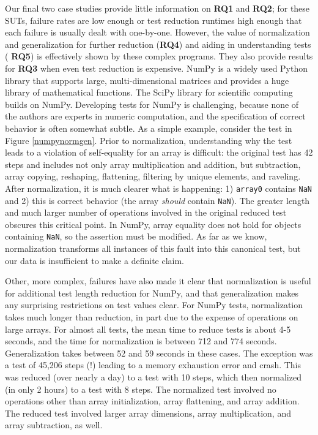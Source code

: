 Our final two case studies provide little information on {\bf RQ1} and
{\bf RQ2}; for these SUTs, failure rates are low enough or test
reduction runtimes high enough that each failure is usually dealt with
one-by-one.  However, the value of normalization and generalization
for further reduction ({\bf RQ4}) and aiding in understanding tests ({\bf
  RQ5}) is effectively shown by these complex programs.  They also provide
results for {\bf RQ3} when even test reduction is expensive.
NumPy \cite{NumPy} is a widely used Python library that
supports large, multi-dimensional matrices and provides a huge library
of mathematical functions.  The SciPy library for scientific
computing builds on NumPy.  Developing tests for NumPy is challenging,
because none of the authors are experts in numeric computation, and
the specification of correct behavior is often somewhat subtle.  As a
simple example, consider the test in Figure \ref{numpynormgen}.  Prior to
normalization, understanding why the test leads to a violation of
self-equality for an array is difficult: the original test has 42
steps and includes not only array multiplication and addition, but
subtraction, array copying, reshaping, flattening,  filtering by
unique elements, and raveling.  After
normalization, it is much clearer what is happening: 1) {\tt array0}
contains {\tt NaN} and 2) this is correct behavior (the array
\emph{should} contain {\tt NaN}).  The greater length and much larger
number of operations involved in the original reduced test
obscures this critical point.  In NumPy, array equality does not hold
for objects containing {\tt NaN}, so the assertion must be modified.
As far as we know, normalization transforms all instances of this
fault into this canonical test, but our data is insufficient to make a definite claim.

Other, more complex, failures have also made it clear that
normalization is useful for additional test length reduction for
NumPy, and that generalization makes any surprising restrictions on
test values clear.  For NumPy tests, normalization takes much longer
than reduction, in part due to the expense of operations on large
arrays.  For almost all tests, the mean time to reduce tests
is about 4-5 seconds, and the time for normalization is between 712
and 774 seconds.   Generalization takes
between 52 and 59 seconds in these cases.  The exception was a test of 45,206 steps (!)  leading to a memory exhaustion error and
crash.  This was reduced (over nearly a day) to a test
with 10 steps, which then normalized (in only 2 hours) to a test
with 8 steps.  The normalized test involved no operations other than array
initialization, array flattening, and array
addition.  The reduced test involved larger array dimensions, array
multiplication, and array subtraction, as well.  



